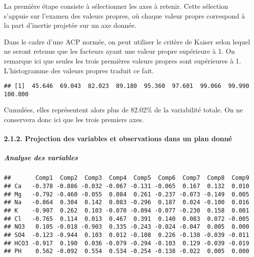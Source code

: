 \documentclass[]{article}
\newenvironment{Shaded}{\begin{snugshade}}{\end{snugshade}}
\newcommand{\KeywordTok}[1]{\textcolor[rgb]{0.13,0.29,0.53}{\textbf{#1}}}
\newcommand{\DecValTok}[1]{\textcolor[rgb]{0.00,0.00,0.81}{#1}}
\newcommand{\OperatorTok}[1]{\textcolor[rgb]{0.81,0.36,0.00}{\textbf{#1}}}
\newcommand{\NormalTok}[1]{#1}
\let\oldparagraph\paragraph
\renewcommand{\paragraph}[1]{\oldparagraph{#1}\mbox{}}
\let\oldsubparagraph\subparagraph
\renewcommand{\subparagraph}[1]{\oldsubparagraph{#1}\mbox{}}
\begin{document}
La première étape consiste à sélectionner les axes à retenir. Cette
sélection s'appuie sur l'examen des valeurs propres, où chaque valeur
propre correspond à la part d'inertie projetée sur un axe donnée.

Dans le cadre d'une ACP normée, on peut utiliser le critère de Kaiser
selon lequel ne seront retenus que les facteurs ayant une valeur propre
supérieure à 1. On remarque ici que seules les trois premières valeurs
propres sont supérieures à 1. L'histogramme des valeurs propres traduit
ce fait.

\begin{Shaded}
\end{Shaded}

\begin{verbatim}
## [1]  45.646  69.043  82.023  89.180  95.360  97.601  99.066  99.990 100.000
\end{verbatim}

Cumulées, elles représentent alors plus de 82.02\% de la variabilité
totale. On ne conservera donc ici que les trois premiers axes.

\hypertarget{projection-des-variables-et-observations-dans-un-plan-donne}{\paragraph{2.1.2.
Projection des variables et observations dans un plan
donné}\label{projection-des-variables-et-observations-dans-un-plan-donne}}

\subparagraph{Analyse des variables}\label{analyse-des-variables}

\begin{Shaded}
\end{Shaded}

\begin{verbatim}
##       Comp1  Comp2  Comp3  Comp4  Comp5  Comp6  Comp7  Comp8  Comp9
## Ca   -0.378 -0.886 -0.032 -0.067 -0.131 -0.065  0.167  0.132  0.010
## Mg   -0.792 -0.460 -0.055  0.084  0.261 -0.237 -0.073 -0.149  0.005
## Na   -0.864  0.304  0.142  0.083 -0.296  0.187  0.024 -0.100  0.016
## K    -0.907  0.262  0.103 -0.070 -0.094 -0.077 -0.230  0.158  0.001
## Cl   -0.765  0.114  0.013  0.467  0.391  0.140  0.083  0.072 -0.005
## NO3   0.105 -0.018 -0.903  0.335 -0.243 -0.024 -0.047  0.005  0.000
## SO4  -0.123 -0.944  0.103  0.012 -0.108  0.226 -0.138 -0.039 -0.011
## HCO3 -0.917  0.190  0.036 -0.079 -0.294 -0.103  0.129 -0.039 -0.019
## PH    0.562 -0.092  0.554  0.534 -0.254 -0.138 -0.022  0.005  0.000
\end{verbatim}
\end{document}
